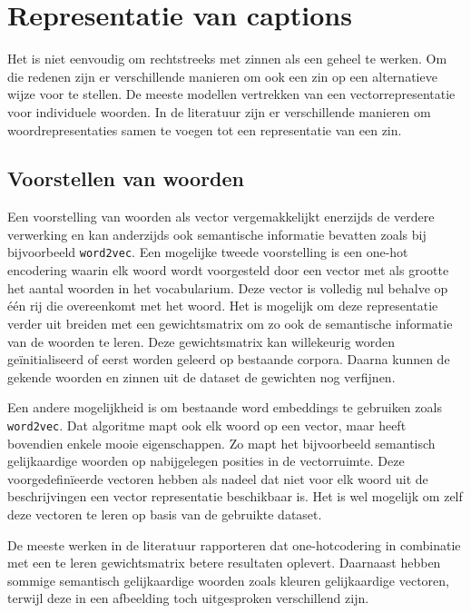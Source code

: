 \section{Representatie van captions}
Het is niet eenvoudig om rechtstreeks met zinnen als een geheel te werken. Om die redenen zijn er verschillende manieren om ook een zin op een alternatieve wijze voor te stellen.
De meeste modellen vertrekken van een vectorrepresentatie voor individuele woorden. In de literatuur zijn er verschillende manieren om woordrepresentaties samen te voegen tot een representatie van een zin.

\subsection{Voorstellen van woorden}
 Een voorstelling van woorden als vector vergemakkelijkt enerzijds de verdere verwerking en kan anderzijds ook semantische informatie bevatten zoals bij bijvoorbeeld \texttt{word2vec}\cite{Mikolov2013}. 
 Een mogelijke tweede voorstelling is een one-hot encodering waarin elk woord wordt voorgesteld door een vector met als grootte het aantal woorden in het vocabularium. Deze vector is volledig nul behalve op \'e\'en rij die overeenkomt met het woord. Het is mogelijk om deze representatie verder uit breiden met een gewichtsmatrix om zo ook de semantische informatie van de woorden te leren. Deze gewichtsmatrix kan willekeurig worden ge\"initialiseerd of eerst worden geleerd op bestaande corpora\cite{Lebret2013,Mao2014a,Google}. Daarna kunnen de gekende woorden en zinnen uit de dataset de gewichten nog verfijnen.  

 Een andere mogelijkheid is om bestaande word embeddings te gebruiken zoals \texttt{word2vec}. Dat algoritme mapt ook elk woord op een vector, maar heeft bovendien enkele mooie eigenschappen. Zo mapt het bijvoorbeeld semantisch gelijkaardige woorden op nabijgelegen posities in de vectorruimte\cite{Mikolov2013}. Deze voorgedefin\"ieerde vectoren hebben als nadeel dat niet voor elk woord uit de beschrijvingen een vector representatie beschikbaar is. Het is wel mogelijk om zelf deze vectoren te leren op basis van de gebruikte dataset.

 De meeste werken in de literatuur rapporteren dat one-hotcodering in combinatie met een te leren gewichtsmatrix betere resultaten oplevert. Daarnaast hebben sommige semantisch gelijkaardige woorden zoals kleuren gelijkaardige vectoren, terwijl deze in een afbeelding toch uitgesproken verschillend zijn\cite{Karpathy2015}.
 
